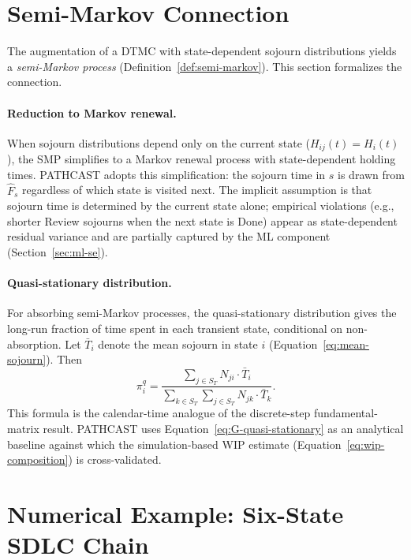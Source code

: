 \section{Semi-Markov Connection}
\label{app:G-semi-markov}

The augmentation of a DTMC with state-dependent sojourn distributions
yields a \emph{semi-Markov process} (Definition~\ref{def:semi-markov}).
This section formalizes the connection.

\paragraph{Reduction to Markov renewal.} When sojourn distributions depend
only on the current state ($H_{ij}(t) = H_i(t)$), the SMP simplifies to a
Markov renewal process with state-dependent holding times. PATHCAST adopts
this simplification: the sojourn time in $s$ is drawn from $\hat{F}_s$
regardless of which state is visited next. The implicit assumption is
that sojourn time is determined by the current state alone; empirical
violations (e.g., shorter Review sojourns when the next state is Done)
appear as state-dependent residual variance and are partially captured by
the ML component (Section~\ref{sec:ml-se}).

\paragraph{Quasi-stationary distribution.} For absorbing semi-Markov
processes, the quasi-stationary distribution gives the long-run fraction
of time spent in each transient state, conditional on non-absorption. Let
$\bar{T}_i$ denote the mean sojourn in state $i$ (Equation~\ref{eq:mean-sojourn}).
Then
\begin{equation}
\label{eq:G-quasi-stationary}
\pi^q_i = \frac{\sum_{j \in S_T} N_{ji} \cdot \bar{T}_i}
              {\sum_{k \in S_T} \sum_{j \in S_T} N_{jk} \cdot \bar{T}_k}.
\end{equation}
This formula is the calendar-time analogue of the discrete-step
fundamental-matrix result. PATHCAST uses
Equation~\ref{eq:G-quasi-stationary} as an analytical baseline against
which the simulation-based WIP estimate
(Equation~\ref{eq:wip-composition}) is cross-validated.


\section{Numerical Example: Six-State SDLC Chain}
\label{app:G-numerical}

